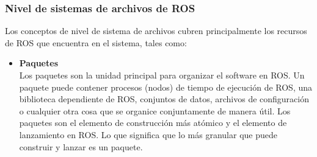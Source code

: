 \subsubsection{Nivel de sistemas de archivos de ROS}
Los conceptos de nivel de sistema de archivos cubren principalmente los recursos de ROS que 
encuentra en el sistema, tales como:
\begin{itemize}
    \item \textbf{Paquetes}\\
    Los paquetes son la unidad principal para organizar el software 
    en ROS. Un paquete puede contener procesos (nodos) de tiempo de ejecución de ROS, 
    una biblioteca dependiente de ROS, conjuntos de datos, archivos de configuración o 
    cualquier otra cosa que se organice conjuntamente de manera útil. Los paquetes son 
    el elemento de construcción más atómico y el elemento de lanzamiento en ROS. Lo 
    que significa que lo más granular que puede construir y lanzar es un paquete.
\end{itemize}
